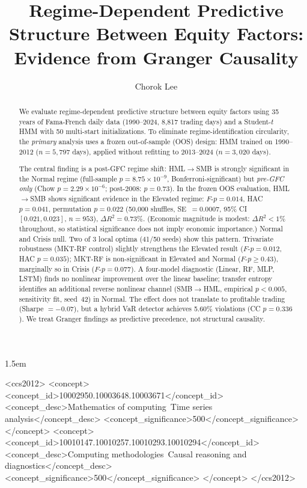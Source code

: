 \documentclass[sigconf,anonymous]{acmart}
\begin{document}
\sloppy
\emergencystretch 1.5em

\title{Regime-Dependent Predictive Structure Between Equity Factors: Evidence from Granger Causality}

\author{Chorok Lee}

\begin{abstract}
We evaluate regime-dependent predictive structure between equity factors using
35 years of Fama-French daily data (1990--2024, 8,817 trading days) and a
Student-$t$ HMM with 50 multi-start initializations.
To eliminate regime-identification circularity, the \emph{primary} analysis
uses a frozen out-of-sample (OOS) design: HMM trained on 1990--2012
($n = 5{,}797$ days), applied without refitting to 2013--2024 ($n = 3{,}020$ days).

The central finding is a post-GFC regime shift: HML$\to$SMB is strongly significant
in the Normal regime (full-sample $p = 8.75 \times 10^{-9}$, Bonferroni-significant)
but \emph{pre-GFC only} (Chow $p = 2.29\times10^{-6}$; post-2008: $p = 0.73$).
In the frozen OOS evaluation, HML$\to$SMB shows significant evidence in the
Elevated regime: $F$-$p = 0.014$, HAC $p = 0.041$, permutation $p = 0.022$
(50{,}000 shuffles, SE~$= 0.0007$, 95\% CI $[0.021, 0.023]$, $n = 953$),
$\Delta R^2 = 0.73\%$.
(Economic magnitude is modest: $\Delta R^2 < 1\%$ throughout, so statistical significance
does not imply economic importance.)
Normal and Crisis null.
Two of 3 local optima (41/50 seeds) show this pattern.
Trivariate robustness (MKT-RF control) slightly strengthens the Elevated result
($F$-$p = 0.012$, HAC $p = 0.035$); MKT-RF is non-significant in Elevated and
Normal ($F$-$p \geq 0.43$), marginally so in Crisis ($F$-$p = 0.077$).
A four-model diagnostic (Linear, RF, MLP, LSTM) finds no nonlinear improvement over
the linear baseline; transfer entropy identifies an additional reverse nonlinear
channel (SMB$\to$HML, empirical $p < 0.005$, sensitivity fit, seed~42) in Normal.
The effect does not translate to profitable trading (Sharpe $= -0.07$), but a hybrid
VaR detector achieves 5.60\% violations (CC $p = 0.336$).
We treat Granger findings as predictive precedence, not structural causality.
\end{abstract}

\begin{CCSXML}
<ccs2012>
   <concept>
       <concept_id>10002950.10003648.10003671</concept_id>
       <concept_desc>Mathematics of computing~Time series analysis</concept_desc>
       <concept_significance>500</concept_significance>
   </concept>
   <concept>
       <concept_id>10010147.10010257.10010293.10010294</concept_id>
       <concept_desc>Computing methodologies~Causal reasoning and diagnostics</concept_desc>
       <concept_significance>500</concept_significance>
   </concept>
</ccs2012>
\end{CCSXML}
\end{document}
